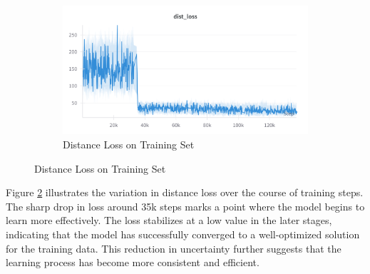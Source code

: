 \documentclass[12pt]{article}
\begin{document}
\begin{figure}[H]
    \centering
    \begin{subfigure}[b]{0.8\textwidth}
        \centering
        \includegraphics[width=\textwidth]{images/dist_loss.png}
        \caption{Distance Loss on Training Set}
        \label{fig:dist_loss}
    \end{subfigure}
    \end{figure}
    Figure \ref{fig:dist_loss} illustrates the variation in distance loss over the course of training steps. The sharp drop in loss around 35k steps marks a point where the model begins to learn more effectively. The loss stabilizes at a low value in the later stages, indicating that the model has successfully converged to a well-optimized solution for the training data. This reduction in uncertainty further suggests that the learning process has become more consistent and efficient.\\
\end{document}

